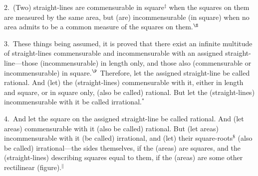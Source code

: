 \begin{Parallel}{}{}
{2.~(Two) straight-lines are commensurable in square$^\ddag$ when the squares on
them are measured by the same area, but (are) incommensurable (in square)
when no area admits to be a common measure of the squares on them.$^\S$

3.~These things being assumed, it is proved that there
exist an infinite multitude of straight-lines commensurable and
incommensurable with an assigned straight-line---those  (incommensurable) in length only, and
those also (commensurable or incommensurable) in square.$^\P$ 
Therefore, let
the assigned straight-line be called rational. And (let) the (straight-lines) commensurable
with it, either in length and square, or in square only, (also be called) rational. But let the (straight-lines) incommensurable with it be called
irrational.$^\ast$ 

4.~And let the square on the assigned straight-line be called  rational. And (let areas) commensurable with it (also be called) rational. But  (let areas) incommensurable with it (be called) irrational, and (let) their square-roots$^\$$ (also be called) irrational---the sides themselves, if the (areas)
are squares, and the (straight-lines) describing squares equal to them, if the (areas) are some other rectilinear (figure).$^\|$}
\end{Parallel}




